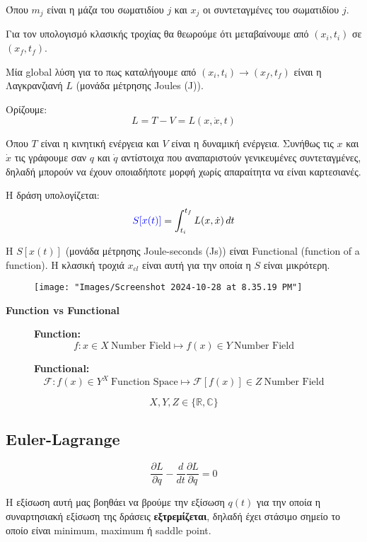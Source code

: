 \documentclass[11pt, oneside]{article}   	%
\newcommand{\note}[1]{
	\begin{tcolorbox}[colback=yellow!5!white,colframe=yellow!75!black,title=\textbf{Σημείωση}]
		\begin{center}
			#1
		\end{center}
	\end{tcolorbox}
}
\begin{document}
Όπου $m_j$ είναι η μάζα του σωματιδίου $j$ και $x_j$ οι συντεταγμένες του σωματιδίου $j$.

Για τον υπολογισμό κλασικής τροχίας θα θεωρούμε ότι μεταβαίνουμε από $(x_i,t_i)$ σε $(x_f,t_f)$.

Μία global λύση για το πως καταλήγουμε από $(x_i,t_i) \rightarrow (x_f,t_f)$ είναι η Λαγκρανζιανή $L$ (μονάδα μέτρησης Joules (J)).

Ορίζουμε:\[L = T - V= L(x, \dot{x},t)\]

Όπου $T$ είναι η κινητική ενέργεια και $V$ είναι η δυναμική ενέργεια. Συνήθως τις $x$ και $\dot{x}$ τις γράφουμε σαν $q$ και $\dot{q}$ αντίστοιχα που αναπαριστούν γενικευμένες συντεταγμένες, δηλαδή μπορούν να έχουν οποιαδήποτε μορφή χωρίς απαραίτητα να είναι καρτεσιανές.

Η δράση υπολογίζεται:
\[\textcolor{blue}{S[x(t)]}=\int_{t_i}^{t_f} L(x,\dot{x}) \, dt\]

Η $S[x(t)]$ (μονάδα μέτρησης Joule-seconds (Js)) είναι Functional (function of a function).
Η κλασική τροχιά $x_{cl}$ είναι αυτή για την οποία η $S$ είναι μικρότερη.

\begin{figure}[H]
	\centering
	\texttt{[image: "Images/Screenshot 2024-10-28 at 8.35.19 PM"]}
	\caption{}
	\label{fig:screenshot-2024-10-28-at-8}
\end{figure}

\note{\textbf{Function vs Functional}\\ 
	\begin{center}
		\begin{figure}[H]
			\centering \textbf{Function:}
			\[
			f : x \in X \ \text{Number Field}\mapsto f(x) \in Y \ \text{Number Field}
			\]
			
			\textbf{Functional:}
			\[
			\mathscr{F} : f(x) \in Y^X \ \text{Function Space} \mapsto \mathscr{F}[f(x)] \in Z \ \text{Number Field}
			\]
			
			\[X, Y, Z \in \{\mathbb{R}, \mathbb{C}\}\]
		\end{figure}
	\end{center}
}

\subsection{Euler-Lagrange}
\[\frac{\partial L}{\partial q} - \frac{d}{dt}\frac{\partial L}{\partial \dot{q}} = 0\]

Η εξίσωση αυτή μας βοηθάει να βρούμε την εξίσωση $q(t)$ για την οποία η συναρτησιακή εξίσωση της δράσεις \textbf{εξτρεμίζεται}, δηλαδή έχει στάσιμο σημείο το οποίο είναι minimum, maximum ή saddle point.
\end{document}
